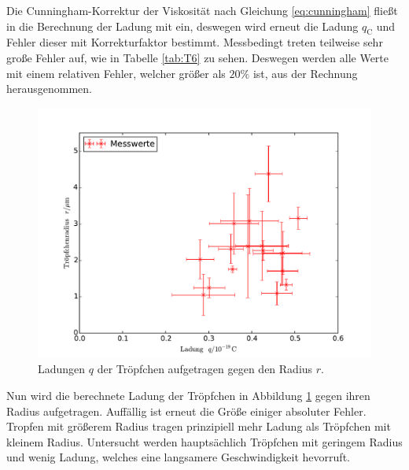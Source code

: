 
Die Cunningham-Korrektur der Viskosität nach Gleichung \eqref{eq:cunningham} fließt in die Berechnung der Ladung mit ein, deswegen wird erneut die Ladung $q_\mathup{C}$ und Fehler dieser mit Korrekturfaktor bestimmt.
Messbedingt treten teilweise sehr große Fehler auf, wie in Tabelle \ref{tab:T6} zu sehen. Deswegen werden alle Werte mit einem relativen Fehler, welcher größer als $20\%$ ist, aus der Rechnung herausgenommen.

\begin{figure}
	\centering
	\includegraphics[width=\textwidth]{Bilder/plot_messwerte.pdf}
	\caption{Ladungen $q$ der Tröpfchen aufgetragen gegen den Radius $r$.}
	\label{fig:1}
\end{figure}
Nun wird die berechnete Ladung der Tröpfchen in Abbildung \ref{fig:1} gegen ihren Radius aufgetragen. Auffällig ist erneut die Größe einiger absoluter Fehler. Tropfen mit größerem Radius tragen prinzipiell mehr Ladung als Tröpfchen mit kleinem Radius. Untersucht werden hauptsächlich Tröpfchen mit geringem Radius und wenig Ladung, welches eine langsamere Geschwindigkeit hevorruft.

